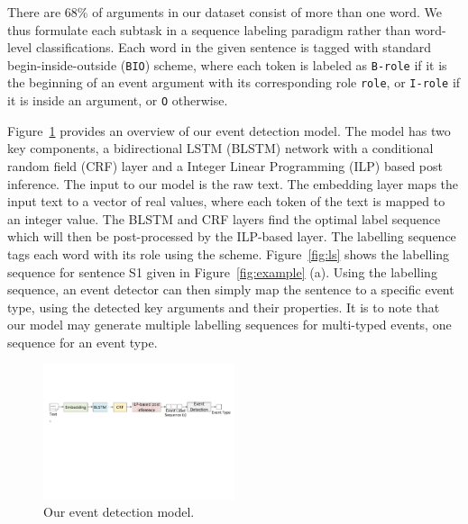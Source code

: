 There are 68\%  of  arguments in our dataset consist of more than one word. We thus formulate each subtask in a sequence labeling paradigm
rather than word-level classifications. Each word in the given sentence is tagged with standard begin-inside-outside (\texttt{BIO})
scheme\FIXME{\cite{}}, where each token is labeled as \texttt{B-role} if it is the beginning of an event argument with its corresponding
role \texttt{role}, or \texttt{I-role} if it is inside an argument, or \texttt{O} otherwise.


Figure~\ref{fig:model} provides an overview of our event detection model. The model has two key components, a bidirectional LSTM (BLSTM)
network with a conditional random field (CRF) layer and a Integer Linear Programming (ILP) based post inference. The input to our model is
the raw text. The embedding layer maps the input text to a vector of real values, where each token of the text is mapped to an integer
value. The BLSTM and CRF layers find the optimal label sequence which will then be post-processed by the ILP-based layer. The labelling
sequence tags each word with its role using the \BIO scheme. Figure~\ref{fig:ls} shows the labelling sequence for sentence S1 given in
Figure~\ref{fig:example} (a).  Using the labelling sequence, an event detector can then simply map the sentence to a specific event type,
using the detected key arguments and their properties. It is to note that our model may generate multiple labelling sequences for
multi-typed events, one sequence for an event type.
\begin{figure}
  \centering
  \includegraphics[width=0.5\textwidth]{figs/model.pdf}
  \caption{Our event detection model.}\label{fig:model}
\end{figure}

